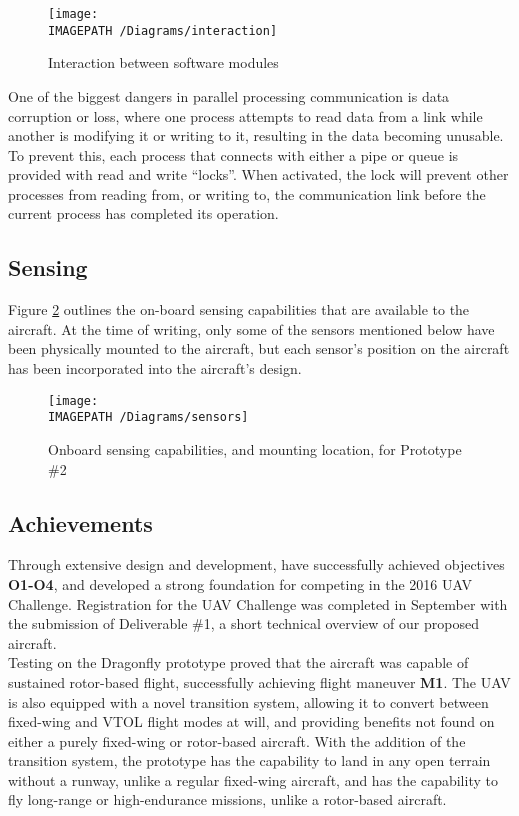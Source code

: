 \begin{figure}[H]
	\centering
	\texttt{[image: \\IMAGEPATH /Diagrams/interaction]}
	\caption{Interaction between software modules}
	\label{fig:softwareinteraction-exec}
\end{figure}

One of the biggest dangers in parallel processing communication is data corruption or loss, where one process attempts to read data from a link while another is modifying it or writing to it, resulting in the data becoming unusable. To prevent this, each process that connects with either a pipe or queue is provided with read and write ``locks''. When activated, the lock will prevent other processes from reading from, or writing to, the communication link before the current process has completed its operation.

\subsection{Sensing}

Figure \ref{fig:sensing-exec} outlines the on-board sensing capabilities that are available to the aircraft. At the time of writing, only some of the sensors mentioned below have been physically mounted to the aircraft, but each sensor's position on the aircraft has been incorporated into the aircraft's design.

\begin{figure}[!ht]
	\centering
	\texttt{[image: \\IMAGEPATH /Diagrams/sensors]}
	\caption{Onboard sensing capabilities, and mounting location, for Prototype \#2}
	\label{fig:sensing-exec}
\end{figure}


\subsection{Achievements}
Through extensive design and development, \ID have successfully achieved objectives \textbf{O1-O4}, and developed a strong foundation for competing in the 2016 UAV Challenge. Registration for the UAV Challenge was completed in September with the submission of Deliverable \#1, a short technical overview of our proposed aircraft.\\

Testing on the Dragonfly prototype proved that the aircraft was capable of sustained rotor-based flight, successfully achieving flight maneuver \textbf{M1}. The UAV is also equipped with a novel transition system, allowing it to convert between fixed-wing and VTOL flight modes at will, and providing benefits not found on either a purely fixed-wing or rotor-based aircraft. With the addition of the transition system, the prototype has the capability to land in any open terrain without a runway, unlike a regular fixed-wing aircraft, and has the capability to fly long-range or high-endurance missions, unlike a rotor-based aircraft.\\

